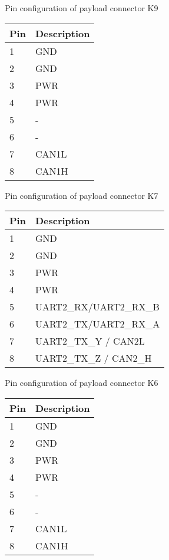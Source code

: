 \begin{appendix}
		\caption{Pin configuration of payload  connector K9}
		\begin{center}
			
		
		\begin{tabular}{p{3cm}p{3cm}}
			\toprule
			
			Pin & Description \\ \midrule
			1 & GND \\ 
			2 & GND \\ 
			3 & PWR \\ 
			4 & PWR \\ 
			5 & - \\ 
			6 & - \\ 
			7 & CAN1L \\ 
			8 & CAN1H \\ 
			\bottomrule
		\end{tabular}
		\label{k9}
	\end{center}
	
	
	
		\caption{Pin configuration of payload  connector K7}
		\begin{center}
			
			
			\begin{tabular}{p{3cm}p{5cm}}
				\toprule
				
				Pin & Description \\ \midrule
				1 & GND \\ 
				2 & GND \\ 
				3 & PWR \\ 
				4 & PWR \\ 
			5 & UART2\_RX/UART2\_RX\_B \\ 
			6 & UART2\_TX/UART2\_RX\_A \\ 
			7 & UART2\_TX\_Y / CAN2L \\ 
			8 & UART2\_TX\_Z / CAN2\_H \\ 
				\bottomrule
			\end{tabular}
			\label{k7}
		\end{center}
	
	
		\caption{Pin configuration of payload  connector K6}
		\begin{center}
			
			
			\begin{tabular}{p{3cm}p{3cm}}
				\toprule
				
				Pin & Description \\ \midrule
				1 & GND \\ 
				2 & GND \\ 
				3 & PWR \\ 
				4 & PWR \\ 
				5 & - \\ 
				6 & - \\ 
				7 & CAN1L \\ 
				8 & CAN1H \\ 
				\bottomrule
			\end{tabular}
			\label{k6}
		\end{center}
	

\end{appendix}
